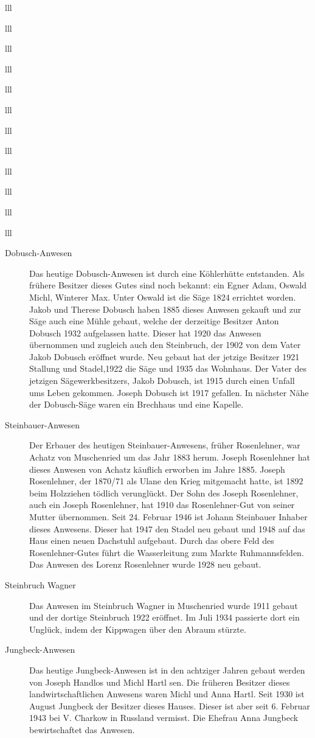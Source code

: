 \documentclass[12pt,a4pager]{book}
\begin{document}
\begin{tabuluar}{lll}
\begin{tabuluar}{lll}
\begin{tabuluar}{lll}
\begin{tabuluar}{lll}
\begin{tabuluar}{lll}
\begin{tabuluar}{lll}
\begin{tabuluar}{lll}
\begin{tabuluar}{lll}
\begin{tabuluar}{lll}
\begin{tabuluar}{lll}
\begin{tabuluar}{lll}
\begin{tabuluar}{lll}
\begin{description}
\item[Dobusch-Anwesen] Das heutige Dobusch-Anwesen ist durch eine Köhlerhütte
entstanden. Als frühere Besitzer dieses Gutes sind noch bekannt: ein Egner Adam,
Oswald Michl, Winterer Max. Unter Oswald ist die Säge 1824 errichtet worden.
Jakob und Therese Dobusch haben 1885 dieses Anwesen gekauft und zur Säge auch
eine Mühle gebaut, welche der derzeitige Besitzer Anton Dobusch 1932 aufgelassen
hatte. Dieser hat 1920 das Anwesen übernommen und zugleich auch den Steinbruch,
der 1902 von dem Vater Jakob Dobusch eröffnet wurde. Neu gebaut hat der jetzige
Besitzer 1921 Stallung und Stadel,1922 die Säge und 1935 das Wohnhaus. Der Vater
des jetzigen Sägewerkbesitzers, Jakob Dobusch, ist 1915 durch einen Unfall ums
Leben gekommen. Joseph Dobusch ist 1917 gefallen. In nächster Nähe der
Dobusch-Säge waren ein Brechhaus und eine Kapelle.

\item[Steinbauer-Anwesen] Der Erbauer des heutigen Steinbauer-Anwesens, früher
Rosenlehner, war Achatz von Muschenried um das Jahr 1883 herum. Joseph
Rosenlehner hat dieses Anwesen von Achatz käuflich erworben im Jahre 1885.
Joseph Rosenlehner, der 1870/71 als Ulane den Krieg mitgemacht hatte, ist 1892
beim Holzziehen tödlich verunglückt. Der Sohn des Joseph Rosenlehner, auch ein
Joseph Rosenlehner, hat 1910 das Rosenlehner-Gut von seiner Mutter übernommen.
Seit 24. Februar 1946 ist Johann Steinbauer Inhaber dieses Anwesens. Dieser hat
1947 den Stadel neu gebaut und 1948 auf das Haus einen neuen Dachstuhl
aufgebaut. Durch das obere Feld des Rosenlehner-Gutes führt die Wasserleitung
zum Markte Ruhmannsfelden. Das Anwesen des Lorenz Rosenlehner wurde 1928 neu
gebaut.

\item[Steinbruch Wagner] Das Anwesen im Steinbruch Wagner in Muschenried wurde
1911 gebaut und der dortige Steinbruch 1922 eröffnet. Im Juli 1934 passierte
dort ein Unglück, indem der Kippwagen über den Abraum stürzte.

\item[Jungbeck-Anwesen] Das heutige Jungbeck-Anwesen ist in den achtziger
Jahren gebaut werden von Joseph Handlos und Michl Hartl sen. Die früheren
Besitzer dieses landwirtschaftlichen Anwesens waren Michl und Anna Hartl. Seit
1930 ist August Jungbeck der Besitzer dieses Hauses. Dieser ist aber seit 6.
Februar 1943 bei V. Charkow in Russland vermisst. Die Ehefrau Anna Jungbeck
bewirtschaftet das Anwesen.
\end{description}


\end{tabuluar}
\end{tabuluar}
\end{tabuluar}
\end{tabuluar}
\end{tabuluar}
\end{tabuluar}
\end{tabuluar}
\end{tabuluar}
\end{tabuluar}
\end{tabuluar}
\end{tabuluar}
\end{tabuluar}
\end{document}
